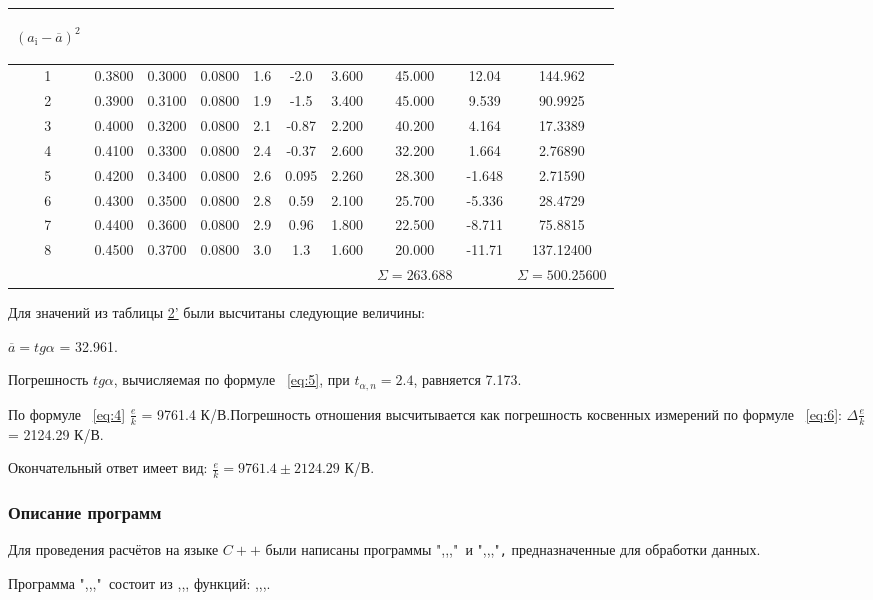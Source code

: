 \begin{center}
\begin{table}[H]
\begin{tabular}{|c|c|c|c|c|c|c|c|c|c|}
\begin{minipage}{20mm}
     \begin{center} $(a_{\text{i}}-\overline{a})^2$ \end{center}
\end{minipage}\\
\hline
1 & 0.3800 & 0.3000 & 0.0800 & 1.6 & -2.0  & 3.600 & 45.000 & 12.04  & 144.962   \\
2 & 0.3900 & 0.3100 & 0.0800 & 1.9 & -1.5  & 3.400 & 45.000 & 9.539  & 90.9925   \\
3 & 0.4000 & 0.3200 & 0.0800 & 2.1 & -0.87 & 2.200 & 40.200 & 4.164  & 17.3389   \\
4 & 0.4100 & 0.3300 & 0.0800 & 2.4 & -0.37 & 2.600 & 32.200 & 1.664  & 2.76890   \\
5 & 0.4200 & 0.3400 & 0.0800 & 2.6 & 0.095 & 2.260 & 28.300 & -1.648 & 2.71590   \\
6 & 0.4300 & 0.3500 & 0.0800 & 2.8 & 0.59  & 2.100 & 25.700 & -5.336 & 28.4729   \\
7 & 0.4400 & 0.3600 & 0.0800 & 2.9 & 0.96  & 1.800 & 22.500 & -8.711 & 75.8815   \\
8 & 0.4500 & 0.3700 & 0.0800 & 3.0 & 1.3   & 1.600 & 20.000 & -11.71 & 137.12400 \\
\hline
 & & & & & & & $\Sigma=263.688$ & & $\Sigma=500.25600$ \\
\hline
\end{tabular}
\end{table}
\end{center}

Для значений из таблицы \hyperref[tabl:4]{2'} были высчитаны следующие величины:

$\overline{a}=tg{\alpha}$ = 32.961.

Погрешность $tg{\alpha}$, вычисляемая по формуле ~\ref{eq:5}, при $t_{\alpha,n}=2.4$, равняется 7.173.

По формуле ~\ref{eq:4} $\frac{e}{k}$ = 9761.4 К/В.Погрешность отношения высчитывается как погрешность косвенных измерений по формуле ~\ref{eq:6}: $\Delta\frac{e}{k}$ = 2124.29 К/В.

Окончательный ответ имеет вид: $\frac{e}{k} = 9761.4 \pm2124.29$ К/В.

\subsubsection{Описание программ}
Для проведения расчётов на языке $C++$ были написаны программы ",,,"\verb| |и ",,,"\verb|,| предназначенные для обработки данных.

Программа ",,,"\verb| |состоит из ,,, функций: ,,,.

